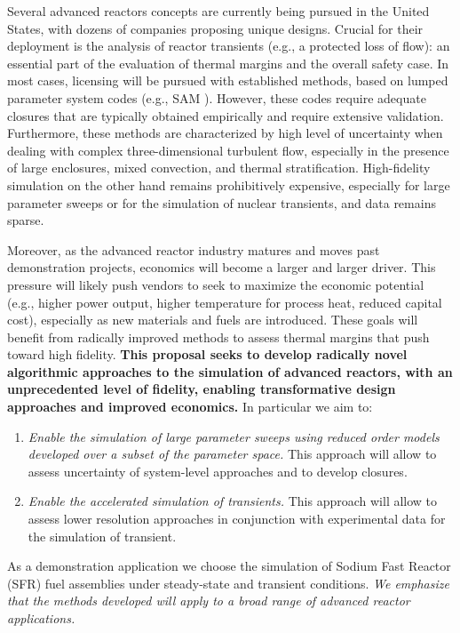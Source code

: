 Several  advanced reactors concepts are currently being pursued in the United
States, with dozens of companies proposing unique designs. Crucial for their
deployment is the analysis of  reactor transients (e.g., a protected loss of
flow): an essential part of the evaluation of thermal margins and the overall
safety case.  In most cases, licensing will be pursued with established
methods, based on lumped parameter system codes (e.g., SAM \cite{hu2021}).
However, these codes require adequate closures that are typically obtained
empirically and require extensive validation. Furthermore, these methods are
characterized by high level of uncertainty when dealing with complex
three-dimensional turbulent flow, especially in the presence of large
enclosures, mixed convection, and thermal stratification. High-fidelity
simulation on the other hand remains prohibitively expensive, especially for
large parameter sweeps or for the simulation of nuclear transients, and data
remains sparse.

Moreover, as the advanced reactor industry matures and moves past demonstration
projects, economics will become a larger and larger driver. This pressure will
likely push vendors to seek to maximize the economic potential (e.g., higher
power output, higher temperature for process heat, reduced capital cost),
especially as new materials and fuels are introduced. These goals will benefit
from radically improved methods to assess thermal margins that push toward high
fidelity. \textbf{This proposal seeks to develop radically novel algorithmic
approaches to the simulation of advanced reactors, with an unprecedented level
of fidelity, enabling transformative design approaches and improved economics.}
In particular we aim to: 
\begin{enumerate}
%
   \item \textit{Enable the simulation of large parameter sweeps using reduced
   order models developed over a subset of the parameter space.} This approach
   will allow to assess uncertainty of system-level approaches and to develop
   closures.
%
   \item \textit{Enable the accelerated simulation of transients.}
   This approach will allow to assess lower resolution approaches in conjunction
   with experimental data for the simulation of transient.  
\end{enumerate}
As a demonstration application we choose the simulation of Sodium Fast Reactor
(SFR) fuel assemblies under steady-state and transient conditions. \textit{We
emphasize that the methods developed will apply to a broad range of advanced
reactor applications.}

